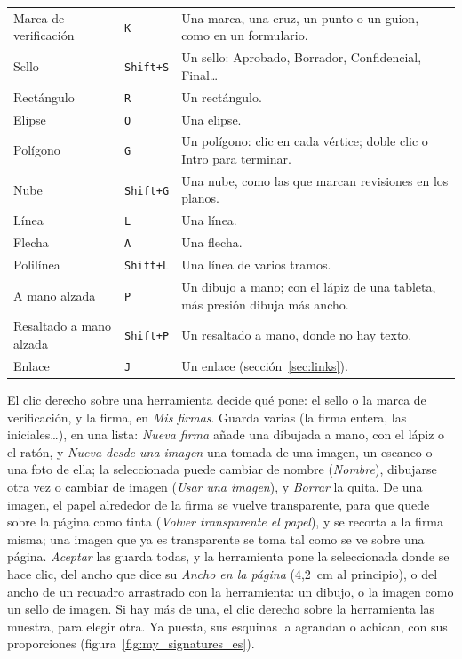 \documentclass[12pt,
              article,
              oneside
              ]{memoir}
\newcommand*{\menu}[1]{\textit{#1}}
\newcommand*{\key}[1]{\texttt{#1}}
\begin{document}
\begin{longtable}{@{}p{}lp{}@{}}
Marca de verificación & \key{K} & Una marca, una cruz, un punto o un guion, como en un formulario.\\
Sello & \key{Shift+S} & Un sello: Aprobado, Borrador, Confidencial, Final\ldots\\
Rectángulo & \key{R} & Un rectángulo.\\
Elipse & \key{O} & Una elipse.\\
Polígono & \key{G} & Un polígono: clic en cada vértice; doble clic o Intro para terminar.\\
Nube & \key{Shift+G} & Una nube, como las que marcan revisiones en los planos.\\
Línea & \key{L} & Una línea.\\
Flecha & \key{A} & Una flecha.\\
Polilínea & \key{Shift+L} & Una línea de varios tramos.\\
A mano alzada & \key{P} & Un dibujo a mano; con el lápiz de una tableta, más presión dibuja más ancho.\\
Resaltado a mano alzada & \key{Shift+P} & Un resaltado a mano, donde no hay texto.\\
Enlace & \key{J} & Un enlace (sección~\ref{sec:links}).\\
\bottomrule
\end{longtable}

%
El clic derecho sobre una herramienta decide qué pone: el sello o la marca
de verificación, y la firma, en \menu{Mis firmas}. Guarda varias (la firma
entera, las iniciales\dots), en una lista: \menu{Nueva firma} añade una
dibujada a mano, con el lápiz o el ratón, y \menu{Nueva desde una imagen}
una tomada de una imagen, un escaneo o una foto de ella; la seleccionada
puede cambiar de nombre (\menu{Nombre}), dibujarse otra vez o cambiar de
imagen (\menu{Usar una imagen}), y \menu{Borrar} la quita. De una imagen, el papel alrededor de la firma
se vuelve transparente, para que quede sobre la página como tinta
(\menu{Volver transparente el papel}), y se recorta a la firma misma; una
imagen que ya es transparente se toma tal como se ve sobre una página.
\menu{Aceptar} las guarda todas, y la herramienta pone la seleccionada
donde se hace clic, del ancho que dice su \menu{Ancho en la página}
(4,2~cm al principio), o del ancho de un recuadro arrastrado con la
herramienta: un dibujo, o la imagen como un sello de imagen. Si hay más de
una, el clic derecho sobre la herramienta las muestra, para elegir otra. Ya puesta, sus esquinas la
agrandan o achican, con sus proporciones (figura~\ref{fig:my_signatures_es}).
\end{document}
